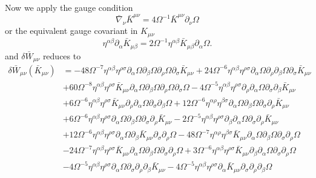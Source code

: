 \documentclass[10pt,letterpaper]{article}
\newcommand{\be}{\begin{equation}} %
\newcommand{\ee}{\end{equation}} %
\newcommand{\del}{\nabla} %
\newcommand{\pd}{\partial}
\begin{document}
Now we apply the gauge condition
\be
	\bar \del_\nu \bar K^{\mu\nu} = 4\Omega^{-1}\bar K^{\mu\nu}\pd_\nu \Omega
\ee
or the equivalent gauge covariant in $K_{\mu\nu}$ 
\be
	\eta^{\alpha\beta}\pd_\alpha \bar K_{\mu\beta} = 2\Omega^{-1}\eta^{\alpha\beta}\bar K_{\mu\beta}\pd_\alpha \Omega.
\ee
and $\delta \bar W_{\mu\nu}$ reduces to
\begin{align}
	\delta \bar W_{\mu\nu}(\bar K_{\mu\nu})&= 
- 48\Omega^{-7} \eta^{\alpha \beta} \eta^{\rho \sigma} \partial_{\alpha}\Omega \partial_{\beta}\Omega \partial_{\rho}\Omega \partial_{\sigma}\bar K_{\mu \nu} + 24\Omega^{-6} \eta^{\alpha \beta} \eta^{\rho \sigma} \partial_{\alpha}\Omega \partial_{\rho}\partial_{\beta}\Omega \partial_{\sigma}\bar K_{\mu \nu} \nonumber\\
& + 60\Omega^{-8} \eta^{\alpha \beta} \eta^{\rho \sigma} \bar K_{\mu \nu} \partial_{\alpha}\Omega \partial_{\beta}\Omega \partial_{\rho}\Omega \partial_{\sigma}\Omega - 4\Omega^{-5} \eta^{\alpha \beta} \eta^{\rho \sigma} \partial_{\rho}\partial_{\alpha}\Omega \partial_{\sigma}\partial_{\beta}\bar K_{\mu \nu} \nonumber \\
&+ 6\Omega^{-6} \eta^{\alpha \beta} \eta^{\rho \sigma} \bar K_{\mu \nu} \partial_{\rho}\partial_{\alpha}\Omega \partial_{\sigma}\partial_{\beta}\Omega + 12\Omega^{-6} \eta^{\alpha \rho} \eta^{\beta \sigma} \partial_{\alpha}\Omega \partial_{\beta}\Omega \partial_{\sigma}\partial_{\rho}\bar K_{\mu \nu}\nonumber\\
& + 6 \Omega^{-6}\eta^{\alpha \beta} \eta^{\rho \sigma} \partial_{\alpha}\Omega \partial_{\beta}\Omega \partial_{\sigma}\partial_{\rho}\bar K_{\mu \nu} - 2\Omega^{-5} \eta^{\alpha \beta} \eta^{\rho \sigma} \partial_{\beta}\partial_{\alpha}\Omega \partial_{\sigma}\partial_{\rho}\bar K_{\mu \nu}  \nonumber \\
&+ 12\Omega^{-6} \eta^{\alpha \beta} \eta^{\rho \sigma} \partial_{\alpha}\Omega \partial_{\beta}\bar K_{\mu \nu} \partial_{\sigma}\partial_{\rho}\Omega -  48\Omega^{-7} \eta^{\alpha \rho} \eta^{\beta \sigma} \bar K_{\mu \nu} \partial_{\alpha}\Omega \partial_{\beta}\Omega \partial_{\sigma}\partial_{\rho}\Omega\nonumber\\
 &-  24\Omega^{-7} \eta^{\alpha \beta} \eta^{\rho \sigma} \bar K_{\mu \nu} \partial_{\alpha}\Omega \partial_{\beta}\Omega \partial_{\sigma}\partial_{\rho}\Omega  + 3\Omega^{-6} \eta^{\alpha \beta} \eta^{\rho \sigma} \bar K_{\mu \nu} \partial_{\beta}\partial_{\alpha}\Omega \partial_{\sigma}\partial_{\rho}\Omega\nonumber\\
 &- 4\Omega^{-5} \eta^{\alpha \beta} \eta^{\rho \sigma} \partial_{\alpha}\Omega \partial_{\sigma}\partial_{\rho}\partial_{\beta}\bar K_{\mu \nu}- 4 \Omega^{-5}\eta^{\alpha \beta} \eta^{\rho \sigma} \partial_{\alpha}\bar K_{\mu \nu} \partial_{\sigma}\partial_{\rho}\partial_{\beta}\Omega\nonumber \\

\end{align}
\end{document}
